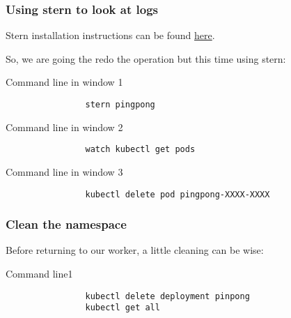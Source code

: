 	\begin{frame}[fragile]
		\frametitle{Using stern to look at logs}

		Stern installation instructions can be found \href{https://github.com/wercker/stern}{here}.
		
		\bigskip
		So, we are going the redo the operation but this time using stern:
		\begin{block}{Command line in window 1}
			\begin{verbatim}
				stern pingpong
			\end{verbatim}
		\end{block}
				\begin{block}{Command line in window 2}
			\begin{verbatim}
				watch kubectl get pods
			\end{verbatim}
		\end{block}
		\begin{block}{Command line in window 3}
			\begin{verbatim}
				kubectl delete pod pingpong-XXXX-XXXX
			\end{verbatim}
		\end{block}
	\end{frame}
	
	\begin{frame}[fragile]
		\frametitle{Clean the namespace}
		
		Before returning to our worker, a little cleaning can be wise:
		\begin{block}{Command line1}
			\begin{verbatim}
				kubectl delete deployment pinpong
				kubectl get all
			\end{verbatim}
		\end{block}
	\end{frame}
			
